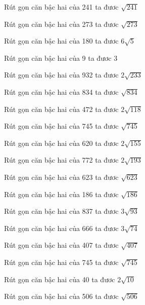 \documentclass[12pt,a4paper]{article}
\begin{document}
\begin{ex}
Rút gọn căn bậc hai của 241 ta đươc $\sqrt{241}$
\end{ex}
\begin{ex}
Rút gọn căn bậc hai của 273 ta đươc $\sqrt{273}$
\end{ex}
\begin{ex}
Rút gọn căn bậc hai của 180 ta đươc $6\sqrt{5}$
\end{ex}
\begin{ex}
Rút gọn căn bậc hai của 9 ta đươc $3$
\end{ex}
\begin{ex}
Rút gọn căn bậc hai của 932 ta đươc $2\sqrt{233}$
\end{ex}
\begin{ex}
Rút gọn căn bậc hai của 834 ta đươc $\sqrt{834}$
\end{ex}
\begin{ex}
Rút gọn căn bậc hai của 472 ta đươc $2\sqrt{118}$
\end{ex}
\begin{ex}
Rút gọn căn bậc hai của 745 ta đươc $\sqrt{745}$
\end{ex}
\begin{ex}
Rút gọn căn bậc hai của 620 ta đươc $2\sqrt{155}$
\end{ex}
\begin{ex}
Rút gọn căn bậc hai của 772 ta đươc $2\sqrt{193}$
\end{ex}
\begin{ex}
Rút gọn căn bậc hai của 623 ta đươc $\sqrt{623}$
\end{ex}
\begin{ex}
Rút gọn căn bậc hai của 186 ta đươc $\sqrt{186}$
\end{ex}
\begin{ex}
Rút gọn căn bậc hai của 837 ta đươc $3\sqrt{93}$
\end{ex}
\begin{ex}
Rút gọn căn bậc hai của 666 ta đươc $3\sqrt{74}$
\end{ex}
\begin{ex}
Rút gọn căn bậc hai của 407 ta đươc $\sqrt{407}$
\end{ex}
\begin{ex}
Rút gọn căn bậc hai của 745 ta đươc $\sqrt{745}$
\end{ex}
\begin{ex}
Rút gọn căn bậc hai của 40 ta đươc $2\sqrt{10}$
\end{ex}
\begin{ex}
Rút gọn căn bậc hai của 506 ta đươc $\sqrt{506}$
\end{ex}
\end{document}
